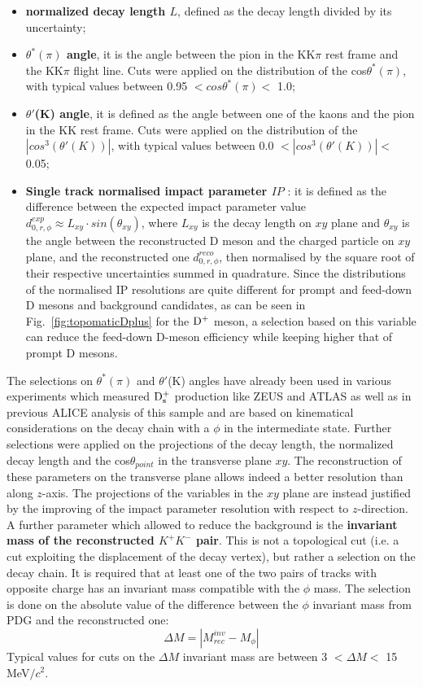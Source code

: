 \begin{itemize}
\item \textbf{normalized decay length $L$}, defined as the decay length 
divided by its uncertainty;
\item \textbf{$\theta^*(\pi)$ angle}, it is the angle between the pion 
in the KK$\pi$ rest frame and the KK$\pi$ flight line. Cuts were applied
 on the distribution of the cos$\theta^*(\pi)$, with typical values 
 between 0.95 $<cos\theta^*(\pi)  <$ 1.0;
\item \textbf{$\theta'$(K) angle}, it is defined as the angle between
 one of the kaons and the pion in the KK rest frame. Cuts were 
 applied on the distribution of the $|cos^3(\theta'(K))|$, with typical 
 values between 0.0 $<|cos^3(\theta'(K))| <$ 0.05;
\item \textbf{Single track normalised impact parameter $IP$} : it is defined 
as the difference between the expected 
impact parameter value $d^{exp}_{0,r,\phi} \approx L_{xy} \cdot sin(\theta_{xy})$,
where $L_{xy}$ is the decay length on $xy$ plane and $\theta_{xy}$ is the angle 
between the reconstructed D meson and the charged particle on $xy$ plane, 
and the reconstructed one $d^{reco}_{0,r,\phi}$, then normalised by the square 
root of their respective uncertainties summed in quadrature. Since the 
distributions of the normalised IP resolutions are quite different for prompt 
and feed-down D mesons and background candidates, as can be seen in 
Fig.~\ref{fig:topomaticDplus} for the ${\rm D^+}$ meson, a selection based on 
this variable can reduce the feed-down D-meson efficiency while keeping 
higher that of prompt D mesons. 
\end{itemize}

The selections on $\theta^*(\pi)$ and $\theta'$(K) angles have already 
been used in various experiments which measured ${\rm D_s^+}$ production 
like ZEUS \cite{Chekanov:2005mm} and ATLAS \cite{ATLAS:2011fea} as well as in previous ALICE
analysis of this sample and are based on kinematical 
considerations on the decay chain with a $\phi$ in the intermediate state.
Further selections were applied on the projections of the decay length, 
the normalized decay length and the cos$\theta_{point}$ in the transverse 
plane $xy$. The reconstruction of these parameters on the transverse plane 
allows indeed a better resolution than along $z$-axis.
The projections of the variables in the $xy$ plane are instead justified by 
the improving of the impact parameter resolution with respect to $z$-direction.\\


A further parameter which allowed to reduce the background is the
 \textbf{invariant mass of the reconstructed $K^+K^-$ pair}. This is not a topological 
 cut (i.e. a cut exploiting the displacement of the decay vertex), 
 but rather a selection on the decay chain. It is required that at least 
 one of the two pairs of tracks with opposite charge has an invariant
  mass compatible with the $\phi$ mass. The selection is done on 
  the absolute value of the difference between the $\phi$ 
   invariant mass from PDG and the reconstructed one:
\[
\Delta M = |M^{inv}_{rec}-M_{\phi}| 
\]
Typical values for cuts on the $\Delta M$ invariant mass 
are between 3 $<\Delta M<$ 15 MeV$/c^2$.


